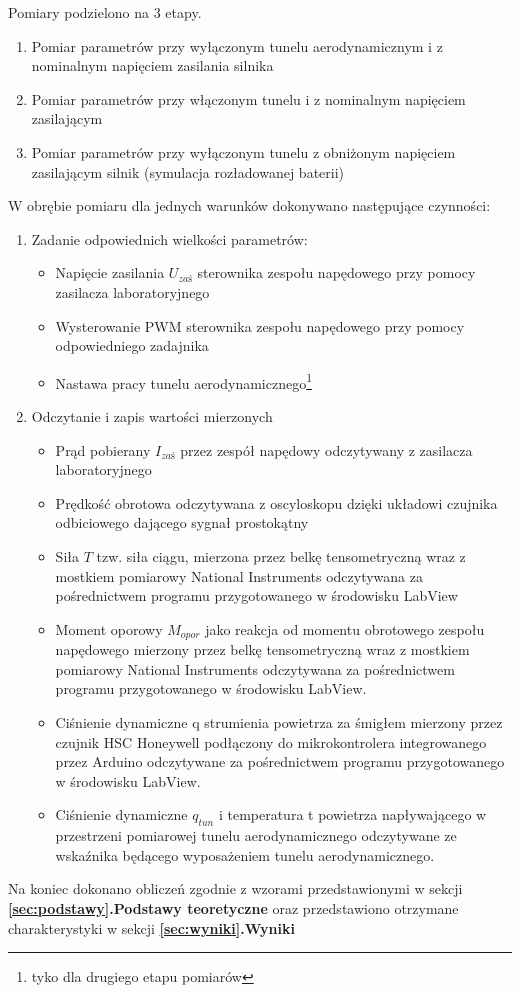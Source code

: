 \akapit Pomiary podzielono na 3 etapy.

\begin{enumerate}
    \item Pomiar parametrów przy wyłączonym tunelu aerodynamicznym i z nominalnym napięciem zasilania silnika
    \item Pomiar parametrów przy włączonym tunelu i z nominalnym napięciem zasilającym
    \item Pomiar parametrów przy wyłączonym tunelu z obniżonym napięciem zasilającym silnik (symulacja rozładowanej baterii)
\end{enumerate}

\akapit W obrębie pomiaru dla jednych warunków dokonywano następujące czynności:

\begin{enumerate}
    \item Zadanie odpowiednich wielkości parametrów:
    \begin{itemize}
        \item  Napięcie zasilania $U_{zaś}$ sterownika zespołu napędowego przy pomocy zasilacza laboratoryjnego
        \item Wysterowanie PWM sterownika zespołu napędowego przy pomocy odpowiedniego zadajnika
        \item Nastawa pracy tunelu aerodynamicznego\footnote{tyko dla drugiego etapu pomiarów}
    \end{itemize}
    \item Odczytanie i zapis wartości mierzonych
    \begin{itemize}
        \item Prąd pobierany $I_{zaś}$ przez zespół napędowy odczytywany z zasilacza laboratoryjnego
        \item Prędkość obrotowa odczytywana z oscyloskopu dzięki układowi czujnika odbiciowego dającego sygnał prostokątny
        \item Siła $T$ tzw. siła ciągu, mierzona przez belkę tensometryczną wraz z mostkiem pomiarowy National Instruments odczytywana za pośrednictwem programu przygotowanego w środowisku LabView
        \item Moment oporowy $M_{opor}$ jako reakcja od momentu obrotowego zespołu napędowego mierzony przez belkę tensometryczną wraz z mostkiem pomiarowy National Instruments odczytywana za pośrednictwem programu przygotowanego w środowisku LabView.
        \item Ciśnienie dynamiczne q strumienia powietrza za śmigłem mierzony przez czujnik HSC Honeywell podłączony do mikrokontrolera integrowanego przez Arduino odczytywane za pośrednictwem programu przygotowanego w środowisku LabView.
        \item Ciśnienie dynamiczne $q_{tun}$ i temperatura t powietrza napływającego w przestrzeni pomiarowej tunelu aerodynamicznego odczytywane ze wskaźnika będącego wyposażeniem tunelu aerodynamicznego.
    \end{itemize}
\end{enumerate}

\akapit Na koniec dokonano obliczeń zgodnie z wzorami przedstawionymi w sekcji \textbf{\ref{sec:podstawy}.Podstawy teoretyczne} oraz przedstawiono otrzymane charakterystyki w sekcji \textbf{\ref{sec:wyniki}.Wyniki}
